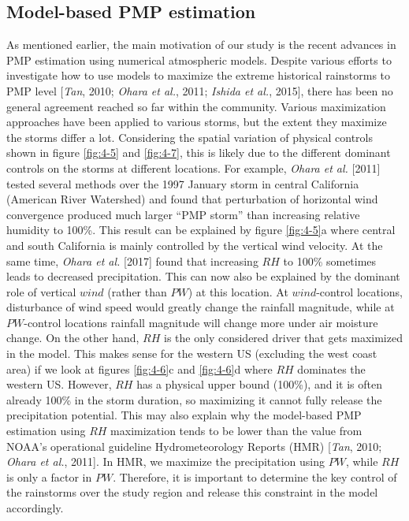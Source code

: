 \subsection{Model-based PMP estimation}

As mentioned earlier, the main motivation of our study is the recent advances in PMP estimation using numerical atmospheric models. Despite various efforts to investigate how to use models to maximize the extreme historical rainstorms to PMP level [\textit{Tan}, 2010; \textit{Ohara et al.}, 2011; \textit{Ishida et al.}, 2015], there has been no general agreement reached so far within the community. Various maximization approaches have been applied to various storms, but the extent they maximize the storms differ a lot. Considering the spatial variation of physical controls shown in figure \ref{fig:4-5} and \ref{fig:4-7}, this is likely due to the different dominant controls on the storms at different locations. For example, \textit{Ohara et al.} [2011] tested several methods over the 1997 January storm in central California (American River Watershed) and found that perturbation of horizontal wind convergence produced much larger “PMP storm” than increasing relative humidity to 100\%. This result can be explained by figure \ref{fig:4-5}a where central and south California is mainly controlled by the vertical wind velocity. At the same time, \textit{Ohara et al.} [2017] found that increasing $RH$ to 100\% sometimes leads to decreased precipitation. This can now also be explained by the dominant role of vertical $wind$ (rather than $PW$) at this location. At $wind$-control locations, disturbance of wind speed would greatly change the rainfall magnitude, while at $PW$-control locations rainfall magnitude will change more under air moisture change. On the other hand, $RH$ is the only considered driver that gets maximized in the model. This makes sense for the western US (excluding the west coast area) if we look at figures \ref{fig:4-6}c and \ref{fig:4-6}d where $RH$ dominates the western US. However, $RH$ has a physical upper bound (100\%), and it is often already 100\% in the storm duration, so maximizing it cannot fully release the precipitation potential. This may also explain why the model-based PMP estimation using $RH$ maximization tends to be lower than the value from NOAA’s operational guideline Hydrometeorology Reports (HMR) [\textit{Tan}, 2010; \textit{Ohara et al.}, 2011]. In HMR, we maximize the precipitation using $PW$, while $RH$ is only a factor in $PW$. Therefore, it is important to determine the key control of the rainstorms over the study region and release this constraint in the model accordingly.

